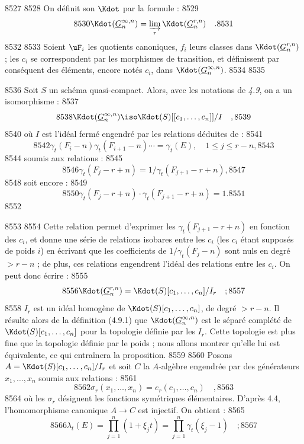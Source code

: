   8527	
  8528	On d\'efinit son $\Kdot$ par la formule :
  8529	\[
  8530	\Kdot(\underline{G}_n^{\infty,n}) = \varinjlim_{r} \Kdot(\underline{G}_n^{r,n}) \quad .
  8531	\]
  8532	
  8533	Soient $\uF_i$ les quotients canoniques, $f_i$ leurs classes dans $\Kdot(\underline{G}_n^{r,n})$ ; les $c_i$ se correspondent par les morphismes de transition, et d\'efinissent par cons\'equent des \'el\'ements, encore not\'es $c_i$, dans $\Kdot(\underline{G}_n^{\infty,n})$.
  8534	
  8535	\begin{proposition}[4.10]
  8536	Soit $S$ un sch\'ema quasi-compact. Alors, avec les notations de \emph{4.9}, on a un isomorphisme :
  8537	\[
  8538	\Kdot(\underline{G}_n^{\infty,n}) \iso \Kdot(S)[[c_1,\dots,c_n]]/I \quad ,
  8539	\]
  8540	o\`u $I$ est l'id\'eal ferm\'e engendr\'e par les relations d\'eduites de :
  8541	\[
  8542	\gamma_t(F_i - n) \gamma_t(F_{i+1} - n) \cdots = \gamma_t(E), \quad 1 \leq j \leq r-n,
  8543	\]
  8544	soumis aux relations :
  8545	\[
  8546	\gamma_t(F_j - r + n) = 1/\gamma_t(F_{j+1} - r + n),
  8547	\]
  8548	soit encore :
  8549	\[
  8550	\gamma_t(F_j - r + n) \cdot \gamma_t(F_{j+1} - r + n) = 1.
  8551	\]
  8552	\end{proposition}
  8553	
  8554	Cette relation permet d'exprimer les $\gamma_t(F_{j+1} - r + n)$ en fonction des $c_i$, et donne une s\'erie de relations isobares entre les $c_i$ (les $c_i$ \'etant suppos\'es de poids $i$) en \'ecrivant que les coefficients de $1/\gamma_t(F_j - n)$ sont nuls en degr\'e $> r-n$ ; de plus, ces relations engendrent l'id\'eal des relations entre les $c_i$. On peut donc \'ecrire :
  8555	\[
  8556	\Kdot(\underline{G}_n^{r,n}) = \Kdot(S)[c_1,\dots,c_n]/I_r \quad ;
  8557	\]
  8558	$I_r$ est un id\'eal homog\`ene de $\Kdot(S)[c_1,\dots,c_n]$, de degr\'e $> r-n$. Il r\'esulte alors de la d\'efinition (4.9.1) que $\Kdot(\underline{G}_n^{\infty,n})$ est le s\'epar\'e compl\'et\'e de $\Kdot(S)[c_1,\dots,c_n]$ pour la topologie d\'efinie par les $I_r$. Cette topologie est plus fine que la topologie d\'efinie par le poids ; nous allons montrer qu'elle lui est \'equivalente, ce qui entra\^inera la proposition.
  8559	
  8560	Posons $A = \Kdot(S)[c_1,\dots,c_n]/I_r$ et soit $C$ la $A$-alg\`ebre engendr\'ee par des g\'en\'erateurs $x_1,\dots,x_n$ soumis aux relations :
  8561	\[
  8562	\sigma_r(x_1,\dots,x_n) = e_r(c_1,\dots,c_n) \quad ,
  8563	\]
  8564	o\`u les $\sigma_r$ d\'esignent les fonctions sym\'etriques \'el\'ementaires. D'apr\`es 4.4, l'homomorphisme canonique $A \to C$ est injectif. On obtient :
  8565	\[
  8566	\lambda_t(E) = \prod_{j=1}^{n} (1 + \xi_j t) = \prod_{j=1}^{n} \gamma_t(\xi_j - 1) \quad ;
  8567	\]
